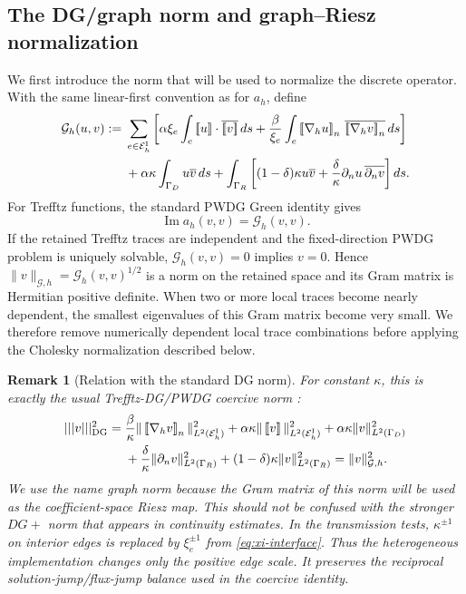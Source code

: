 \documentclass[pdflatex,sn-mathphys-num]{sn-jnl}
\theoremstyle{thmstyleone}
\theoremstyle{thmstyletwo}
\newtheorem{remark}[theorem]{Remark}
\newcommand{\Ei}{\mathcal E_h^{\rm I}}
\newcommand{\jump}[1]{\left[\!\left[#1\right]\!\right]}
\newcommand{\jumpn}[1]{\left[\!\left[#1\right]\!\right]_{n}}
\begin{document}
\subsection{The DG/graph norm and graph--Riesz normalization}
We first introduce the norm that will be used to normalize the discrete operator.  With the same linear-first convention as for $a_h$, define
\begin{equation}\label{eq:graphform}
\begin{aligned}
 \mathcal G_h(u,v):={}&
 \sum_{e\in\Ei}\left[
 \alpha\xi_e\int_e \jump u\cdot\overline{\jump v}\,ds
 +\frac{\beta}{\xi_e}\int_e\jumpn{\nabla_hu}\,\overline{\jumpn{\nabla_hv}}\,ds
 \right]\\
 &+\alpha\kappa\int_{\Gamma_D}u\overline v\,ds
 +\int_{\Gamma_R}\left[(1-\delta)\kappa u\overline v
 +\frac{\delta}{\kappa}\partial_nu\,\overline{\partial_nv}\right]ds .
\end{aligned}
\end{equation}
For Trefftz functions, the standard PWDG Green identity gives \cite{GittelsonHiptmairPerugia2009,HiptmairMoiolaPerugia2011,HiptmairMoiolaPerugiaSurvey2016}
\begin{equation}\label{eq:coerciveidentity}
 \operatorname{Im}a_h(v,v)=\mathcal G_h(v,v).
\end{equation}
If the retained Trefftz traces are independent and the fixed-direction PWDG problem is uniquely solvable, $\mathcal G_h(v,v)=0$ implies $v=0$.  Hence $\|v\|_{\mathcal G,h}=\mathcal G_h(v,v)^{1/2}$ is a norm on the retained space and its Gram matrix is Hermitian positive definite.  When two or more local traces become nearly dependent, the smallest eigenvalues of this Gram matrix become very small.  We therefore remove numerically dependent local trace combinations before applying the Cholesky normalization described below.

\begin{remark}[Relation with the standard DG norm]\label{rem:graph-DG}
For constant $\kappa$, this is exactly the usual Trefftz-DG/PWDG coercive norm \cite{HiptmairMoiolaPerugia2011,HiptmairMoiolaPerugiaSurvey2016}:
\begin{align}\label{eq:DGnorm-identification}
 |||v|||_{\rm DG}^2
 ={}&\frac{\beta}{\kappa}\|\jumpn{\nabla_hv}\|_{L^2(\Ei)}^2
 +\alpha\kappa\|\jump v\|_{L^2(\Ei)}^2
 +\alpha\kappa\|v\|_{L^2(\Gamma_D)}^2\\
 &+\frac{\delta}{\kappa}\|\partial_n v\|_{L^2(\Gamma_R)}^2
 +(1-\delta)\kappa\|v\|_{L^2(\Gamma_R)}^2
 =\|v\|_{\mathcal G,h}^2.\nonumber
\end{align}
We use the name \emph{graph norm} because the Gram matrix of this norm will be used as the coefficient-space Riesz map.  This should not be confused with the stronger $DG+$ norm that appears in continuity estimates.  In the transmission tests, $\kappa^{\pm1}$ on interior edges is replaced by $\xi_e^{\pm1}$ from \eqref{eq:xi-interface}.  Thus the heterogeneous implementation changes only the positive edge scale.  It preserves the reciprocal solution-jump/flux-jump balance used in the coercive identity.
\end{remark}
\end{document}
